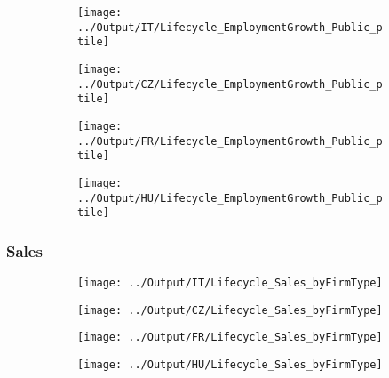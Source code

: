 \documentclass[12pt,notitlepage]{article}
\begin{document}
\begin{figure}[!htpb]
\centering
\caption{Employment Growth (Percentile - Public)}
\begin{subfigure}{.49\textwidth}
    \centering
 \texttt{[image: ../Output/IT/Lifecycle\_EmploymentGrowth\_Public\_ptile]}
\end{subfigure}%
\begin{subfigure}{.49\textwidth}
    \centering
 \texttt{[image: ../Output/CZ/Lifecycle\_EmploymentGrowth\_Public\_ptile]}
\end{subfigure}
\begin{subfigure}{.49\textwidth}
    \centering
 \texttt{[image: ../Output/FR/Lifecycle\_EmploymentGrowth\_Public\_ptile]}
\end{subfigure}%
\begin{subfigure}{.49\textwidth}
    \centering
 \texttt{[image: ../Output/HU/Lifecycle\_EmploymentGrowth\_Public\_ptile]}
\end{subfigure}
\end{figure}
\pagebreak


\subsubsection{Sales}
\begin{figure}[!htpb]
\centering
\caption{Sales (Average)}
\begin{subfigure}{.49\textwidth}
    \centering
 \texttt{[image: ../Output/IT/Lifecycle\_Sales\_byFirmType]}
\end{subfigure}%
\begin{subfigure}{.49\textwidth}
    \centering
 \texttt{[image: ../Output/CZ/Lifecycle\_Sales\_byFirmType]}
\end{subfigure}
\begin{subfigure}{.49\textwidth}
    \centering
 \texttt{[image: ../Output/FR/Lifecycle\_Sales\_byFirmType]}
\end{subfigure}%
\begin{subfigure}{.49\textwidth}
    \centering
 \texttt{[image: ../Output/HU/Lifecycle\_Sales\_byFirmType]}
\end{subfigure}
\end{figure}
\pagebreak
\end{document}
